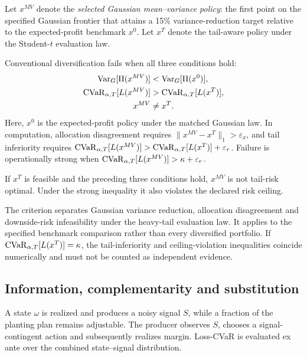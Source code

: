 Let \(x^{MV}\) denote the \emph{selected Gaussian mean--variance policy}: the
first point on the specified Gaussian frontier that attains a 15\%
variance-reduction target relative to the expected-profit benchmark \(x^0\).
Let \(x^T\) denote the tail-aware policy under the Student-\(t\) evaluation
law.

\begin{definition}
Conventional diversification fails when all three conditions hold:
\begin{align}
\operatorname{Var}_G[\Pi(x^{MV})]&<
\operatorname{Var}_G[\Pi(x^0)],\\
\operatorname{CVaR}_{\alpha,T}[L(x^{MV})]&>
\operatorname{CVaR}_{\alpha,T}[L(x^T)],\\
x^{MV}&\ne x^T.
\end{align}
Here, \(x^0\) is the expected-profit policy under the matched Gaussian law.
In computation, allocation disagreement requires
\(\lVert x^{MV}-x^T\rVert_1>\varepsilon_x\), and tail inferiority requires
\(\operatorname{CVaR}_{\alpha,T}[L(x^{MV})]>
\operatorname{CVaR}_{\alpha,T}[L(x^T)]+\varepsilon_r\).
Failure is operationally strong when
\(\operatorname{CVaR}_{\alpha,T}[L(x^{MV})]>\kappa+\varepsilon_r\).
\end{definition}

\begin{proposition}
If \(x^T\) is feasible and the preceding three conditions hold,
\(x^{MV}\) is not tail-risk optimal. Under the strong inequality it also
violates the declared risk ceiling.
\end{proposition}

The criterion separates Gaussian variance reduction, allocation disagreement
and downside-risk infeasibility under the heavy-tail evaluation law. It
applies to the specified benchmark comparison rather than every diversified
portfolio. If
\(\operatorname{CVaR}_{\alpha,T}[L(x^T)]=\kappa\), the tail-inferiority and ceiling-violation
inequalities coincide numerically and must not be counted as independent
evidence.

\subsection{Information, complementarity and substitution}

A state \(\omega\) is realized and produces a noisy signal \(S\), while a
fraction of the planting plan remains adjustable. The producer observes
\(S\), chooses a signal-contingent action and subsequently realizes margin.
Loss-CVaR is evaluated ex ante over the combined state--signal distribution.

